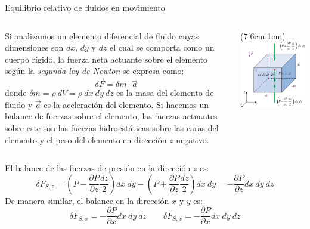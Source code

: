 \documentclass [xcolor=svgnames, t] {beamer}
\begin{document}
\begin{frame}{Equilibrio relativo de fluidos en movimiento}
\footnotesize
\vspace{-0.4cm}
\begin{columns}
Si analizamos un elemento diferencial de fluido cuyas dimensiones son $dx$, $dy$ y $dz$  el cual se comporta como un cuerpo r\'igido, la fuerza neta actuante sobre el elemento seg\'un la \emph{segunda ley de Newton} se expresa como:
$$
\delta \vec{F} = \delta m \cdot \vec{a}
$$
donde $\delta m = \rho\ dV = \rho\ dx\ dy\ dz$ es la masa del elemento de fluido y $\vec{a}$ es la aceleraci\'on del elemento. 
Si hacemos un balance de fuerzas sobre el elemento, las fuerzas actuantes sobre este son las fuerzas hidroest\'aticas sobre las caras del elemento  y el peso del elemento en direcci\'on $z$ negativo.
\begin{textblock*}{5cm}(7.6cm,1cm) %
\includegraphics[width=\textwidth]{body}
\end{textblock*}
\end{columns}
\vspace{0.5cm}
El balance de las fuerzas de presi\'on en la direcci\'on $z$ es:
$$
\delta F_{S,z} = \left( P - \frac{\partial P}{\partial z} \frac{dz}{2} \right) dx\ dy - \left( P + \frac{\partial P}{\partial z} \frac{dz}{2} \right) dx\ dy = -\frac{\partial P}{\partial z} dx\ dy\ dz
$$
De manera similar, el balance en la direcci\'on $x$ y $y$ es:
$$
\delta F_{S,x} =  -\frac{\partial P}{\partial x} dx\ dy\ dz \quad \quad  \delta F_{S,x} =  -\frac{\partial P}{\partial x} dx\ dy\ dz
$$
\end{frame}
\end{document}
